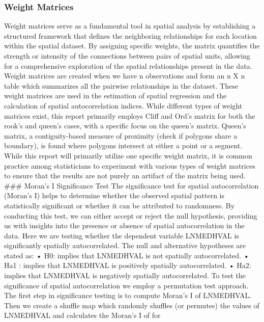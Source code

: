\documentclass[
]{article}
\begin{document}
\hypertarget{weight-matrices}{%
\subsubsection{Weight Matrices}\label{weight-matrices}}

Weight matrices serve as a fundamental tool in spatial analysis by
establishing a structured framework that defines the neighboring
relationships for each location within the spatial dataset. By assigning
specific weights, the matrix quantifies the strength or intensity of the
connections between pairs of spatial units, allowing for a comprehensive
exploration of the spatial relationships present in the data. Weight
matrices are created when we have n observations and form an n X n table
which summarizes all the pairwise relationships in the dataset. These
weight matrices are used in the estimation of spatial regression and the
calculation of spatial autocorrelation indices. While different types of
weight matrices exist, this report primarily employs Cliff and Ord's
matrix for both the rook's and queen's cases, with a specific focus on
the queen's matrix. Queen's matrix, a contiguity-based measure of
proximity (check if polygons share a boundary), is found where polygons
intersect at either a point or a segment. While this report will
primarily utilize one specific weight matrix, it is common practice
among statisticians to experiment with various types of weight matrices
to ensure that the results are not purely an artifact of the matrix
being used. \#\#\# Moran's I Significance Test The significance test for
spatial autocorrelation (Moran's I) helps to determine whether the
observed spatial pattern is statistically significant or whether it can
be attributed to randomness. By conducting this test, we can either
accept or reject the null hypothesis, providing us with insights into
the presence or absence of spatial autocorrelation in the data. Here we
are testing whether the dependent variable LNMEDHVAL is significantly
spatially autocorrelated. The null and alternative hypotheses are stated
as: • H0: implies that LNMEDHVAL is not spatially autocorrelated. • Ha1
: implies that LNMEDHVAL is positively spatially autocorrelated. • Ha2:
implies that LNMEDHVAL is negatively spatially autocorrelated. To test
the significance of spatial autocorrelation we employ a permutation test
approach. The first step in significance testing is to compute Moran's I
of LNMEDHVAL. Then we create a shuffle map which randomly shuffles (or
permutes) the values of LNMEDHVAL and calculates the Moran's I of for
\end{document}
